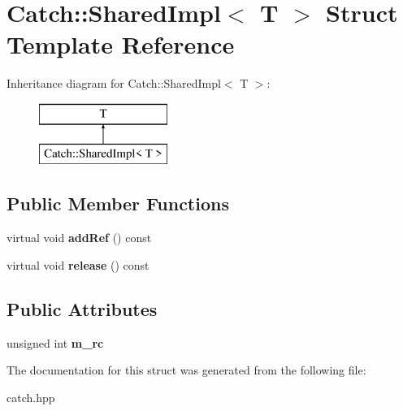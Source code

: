 \hypertarget{structCatch_1_1SharedImpl}{}\section{Catch\+:\+:Shared\+Impl$<$ T $>$ Struct Template Reference}
\label{structCatch_1_1SharedImpl}
Inheritance diagram for Catch\+:\+:Shared\+Impl$<$ T $>$\+:\begin{figure}[H]
\begin{center}
\leavevmode
\includegraphics[height=2.000000cm]{structCatch_1_1SharedImpl}
\end{center}
\end{figure}
\subsection*{Public Member Functions}
\begin{DoxyCompactItemize}
\item 
virtual void {\bfseries add\+Ref} () const \hypertarget{structCatch_1_1SharedImpl_a9b190b7a139a09d2624d1201d8e4f87e}{}\label{structCatch_1_1SharedImpl_a9b190b7a139a09d2624d1201d8e4f87e}

\item 
virtual void {\bfseries release} () const \hypertarget{structCatch_1_1SharedImpl_a16baad80ad5ad3dfaf2a10a157a02e01}{}\label{structCatch_1_1SharedImpl_a16baad80ad5ad3dfaf2a10a157a02e01}

\end{DoxyCompactItemize}
\subsection*{Public Attributes}
\begin{DoxyCompactItemize}
\item 
unsigned int {\bfseries m\+\_\+rc}\hypertarget{structCatch_1_1SharedImpl_a7e71ef1985b85aa41a1632f932a96bcb}{}\label{structCatch_1_1SharedImpl_a7e71ef1985b85aa41a1632f932a96bcb}

\end{DoxyCompactItemize}


The documentation for this struct was generated from the following file\+:\begin{DoxyCompactItemize}
\item 
catch.\+hpp\end{DoxyCompactItemize}
